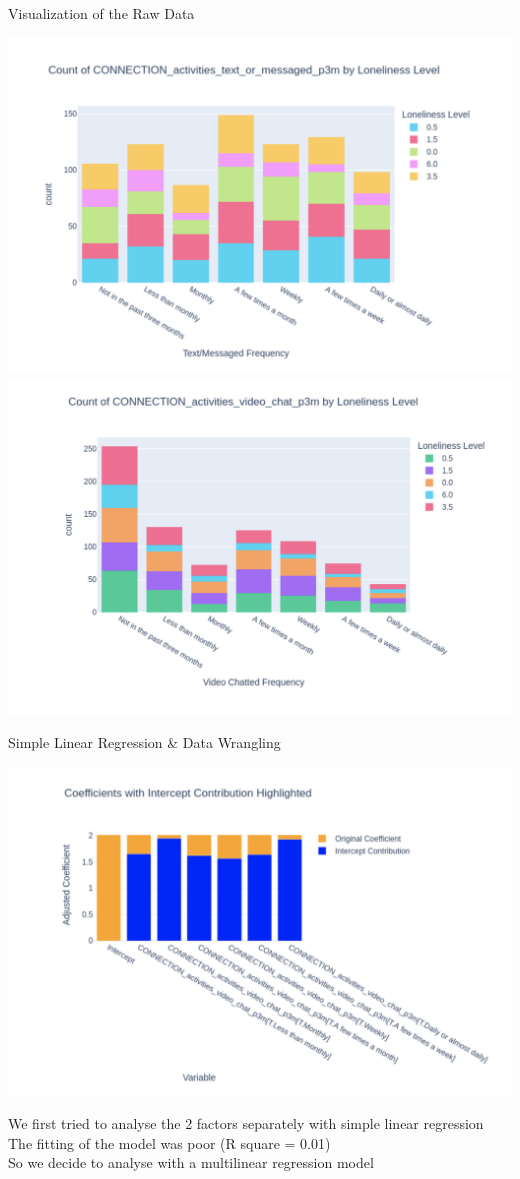 \documentclass{beamer}
\begin{document}
\begin{frame}{Visualization of the Raw Data}


\includegraphics[width=0.5\linewidth]{Screenshot 2024-11-28 at 12.28.29 PM.png}
\includegraphics[width=0.5\linewidth]{Screenshot 2024-11-28 at 12.31.04 PM.png}


\end{frame}

\begin{frame}{Simple Linear Regression & Data Wrangling}

\includegraphics[width=0.5\linewidth]{Screenshot 2024-11-28 at 12.32.21 PM.png}

We first tried to analyse the 2 factors separately with simple linear regression\\
The fitting of the model was poor (R square = 0.01)\\
So we decide to analyse with a  multilinear regression model\\
\end{frame}
\end{document}
